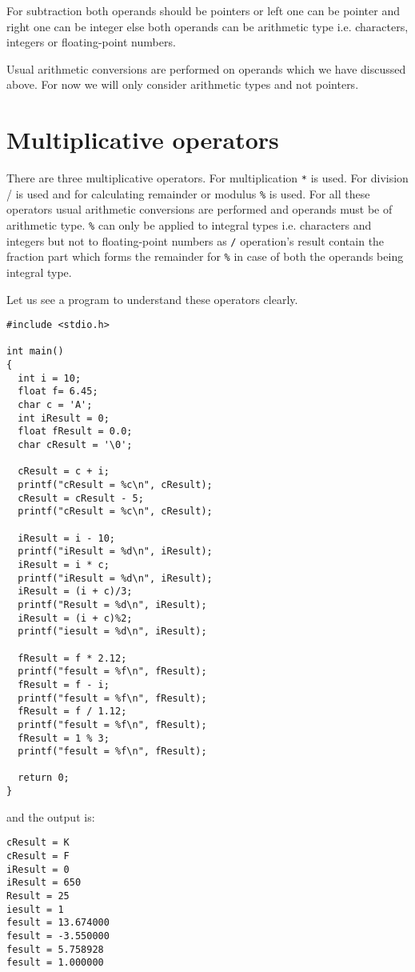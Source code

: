For subtraction both operands should be pointers or left one can be pointer and
right one can be integer else both operands can be arithmetic type
i.e. characters, integers or floating-point numbers.

Usual arithmetic conversions are performed on operands which we have discussed
above. For now we will only consider arithmetic types and not pointers.

\section{Multiplicative operators}
There are three multiplicative operators. For multiplication \texttt{*} is
used. For division / is used and for calculating remainder or modulus
\texttt{\%} is used. For all these operators usual arithmetic conversions are
performed and operands must be of arithmetic type. \texttt{\%} can only be
applied to integral types i.e. characters and integers but not to
floating-point numbers as \texttt{/} operation's result contain the fraction
part which forms the remainder for \texttt{\%} in case of both the operands
being integral type.

Let us see a program to understand these operators clearly.
\begin{verbatim}
#include <stdio.h>

int main()
{
  int i = 10;
  float f= 6.45;
  char c = 'A';
  int iResult = 0;
  float fResult = 0.0;
  char cResult = '\0';

  cResult = c + i;
  printf("cResult = %c\n", cResult);
  cResult = cResult - 5;
  printf("cResult = %c\n", cResult);

  iResult = i - 10;
  printf("iResult = %d\n", iResult);
  iResult = i * c;
  printf("iResult = %d\n", iResult);
  iResult = (i + c)/3;
  printf("Result = %d\n", iResult);
  iResult = (i + c)%2;
  printf("iesult = %d\n", iResult);

  fResult = f * 2.12;
  printf("fesult = %f\n", fResult);
  fResult = f - i;
  printf("fesult = %f\n", fResult);  
  fResult = f / 1.12;
  printf("fesult = %f\n", fResult);
  fResult = 1 % 3;
  printf("fesult = %f\n", fResult);

  return 0;
}
\end{verbatim}

and the output is:

\begin{Verbatim}
cResult = K
cResult = F
iResult = 0
iResult = 650
Result = 25
iesult = 1
fesult = 13.674000
fesult = -3.550000
fesult = 5.758928
fesult = 1.000000
\end{Verbatim}

